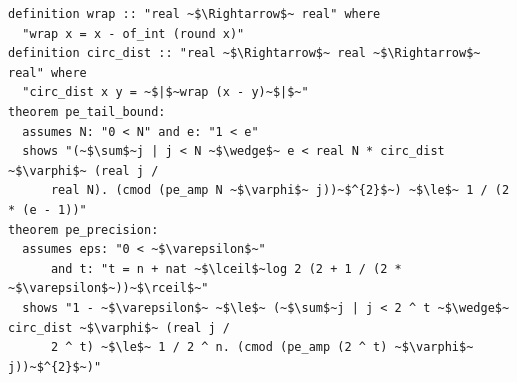 \documentclass[runningheads]{llncs}
\begin{document}
\noindent\begin{minipage}{\linewidth}
\begin{lstlisting}[caption={Theorem~\ref{thm:qpe-tail}},label={lst:qpetail}]
definition wrap :: "real ~$\Rightarrow$~ real" where
  "wrap x = x - of_int (round x)"
definition circ_dist :: "real ~$\Rightarrow$~ real ~$\Rightarrow$~ real" where
  "circ_dist x y = ~$|$~wrap (x - y)~$|$~"
theorem pe_tail_bound:
  assumes N: "0 < N" and e: "1 < e"
  shows "(~$\sum$~j | j < N ~$\wedge$~ e < real N * circ_dist ~$\varphi$~ (real j /
      real N). (cmod (pe_amp N ~$\varphi$~ j))~$^{2}$~) ~$\le$~ 1 / (2 * (e - 1))"
theorem pe_precision:
  assumes eps: "0 < ~$\varepsilon$~"
      and t: "t = n + nat ~$\lceil$~log 2 (2 + 1 / (2 * ~$\varepsilon$~))~$\rceil$~"
  shows "1 - ~$\varepsilon$~ ~$\le$~ (~$\sum$~j | j < 2 ^ t ~$\wedge$~ circ_dist ~$\varphi$~ (real j /
      2 ^ t) ~$\le$~ 1 / 2 ^ n. (cmod (pe_amp (2 ^ t) ~$\varphi$~ j))~$^{2}$~)"
\end{lstlisting}
\end{minipage}
\end{document}
